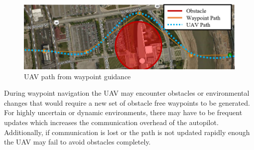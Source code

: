 \documentclass[conf]{new-aiaa}
\begin{document}
%
%


\begin{figure}[H]
	\centering
	\includegraphics[width=1\linewidth]{Figures/simpleWaypointsWithUAVPath}
	\caption{UAV path from waypoint guidance}
	\label{fig:simplewaypointsWithUAVPath}
\end{figure}


During waypoint navigation the UAV may encounter obstacles or environmental changes that would require a new set of obstacle free waypoints to be generated. For highly uncertain or dynamic environments, there may have to be frequent updates which increases the communication overhead of the autopilot. Additionally, if communication is lost or the path is not updated rapidly enough the UAV may fail to avoid obstacles completely.  \\
\end{document}
